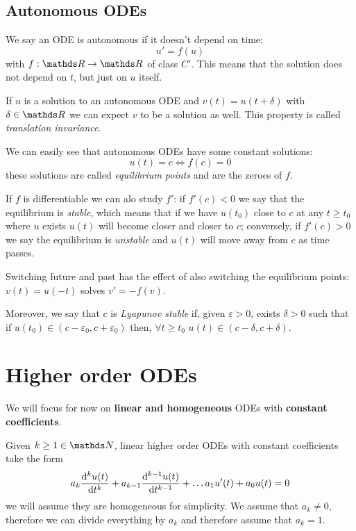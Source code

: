 \documentclass[12pt]{extarticle}
\begin{document}
\subsection{Autonomous ODEs}

We say an ODE is autonomous if it doesn't depend on time:
\begin{equation}
    u' = f(u)
\end{equation}
with $f: \R \to \R$ of class $C'$.
This means that the solution does not depend on $t$, but just on $u$ itself.

If $u$ is a solution to an autonomous ODE and $v(t) = u(t + \delta)$ with $\delta \in \R$ we can expect $v$ to be a solution as well.
This property is called \emph{translation invariance}.

We can easily see that autonomous ODEs have some constant solutions:
\begin{equation}
    u(t) = c \iff f(c) = 0
\end{equation}
these solutions are called \emph{equilibrium points} and are the zeroes of $f$.

If $f$ is differentiable we can alo study $f'$: if $f'(c) < 0$ we say that the equilibrium is \emph{stable}, which means that if we have $u(t_0)$ close to $c$ at any $t \geq t_0$ where $u$ exists $u(t)$ will become closer and closer to $c$; conversely, if $f'(c) > 0$ we say the equilibrium is \emph{unstable} and $u(t)$ will move away from $c$ as time passes.

Switching future and past has the effect of also switching the equilibrium points: $v(t) = u(-t)$ solves $v' = -f(v)$.

Moreover, we say that $c$ is \emph{Lyapunov stable} if, given $\varepsilon > 0$, exists $\delta >0$ such that if $u(t_0) \in (c - \varepsilon_0, c + \varepsilon_0)$ then, $\forall t \geq t_0$ $u(t) \in (c-\delta, c+\delta)$.

\section{Higher order ODEs}

We will focus for now on \textbf{linear and homogeneous} ODEs with \textbf{constant coefficients}.

Given $k \geq 1 \in \N$, linear higher order ODEs with constant coefficients take the form
\begin{equation}
    \label{eq:higher-order-linear-const-coeff-ode}
    a_k \dv[k]{u(t)}{t} + a_{k-1}\dv[k-1]{u(t)}{t} + \dots a_1 u'(t) + a_0 u(t) = 0
\end{equation}
we will assume they are homogeneous for simplicity.
We assume that $a_k \neq 0$, therefore we can divide everything by $a_k$ and therefore assume that $a_k = 1$.
\end{document}
